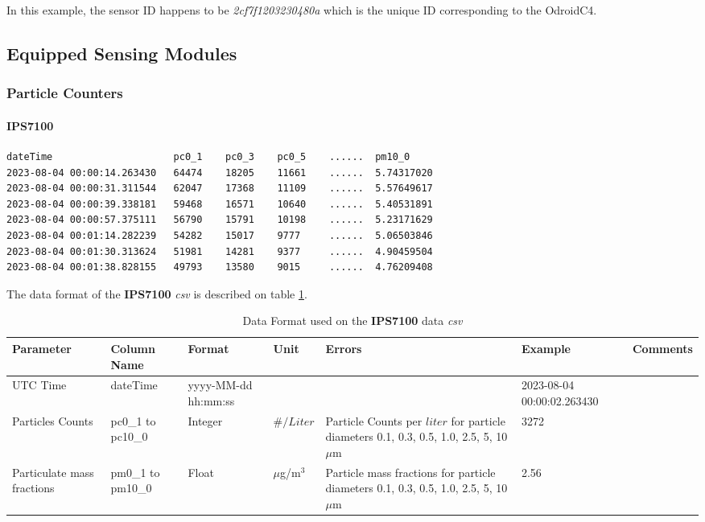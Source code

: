 \documentclass[12pt]{article}
\begin{document}
In this example, the sensor ID happens to be \emph{2cf7f1203230480a} which is the unique ID corresponding to the OdroidC4.
\clearpage

\subsection{Equipped Sensing Modules}
\subsubsection{Particle Counters}
\paragraph{IPS7100}
\label{sec:ips7100DataFormat}
{
\begin{verbatim}
dateTime                     pc0_1    pc0_3    pc0_5    ......  pm10_0
2023-08-04 00:00:14.263430   64474    18205    11661    ......  5.74317020
2023-08-04 00:00:31.311544   62047    17368    11109    ......  5.57649617
2023-08-04 00:00:39.338181   59468    16571    10640    ......  5.40531891
2023-08-04 00:00:57.375111   56790    15791    10198    ......  5.23171629
2023-08-04 00:01:14.282239   54282    15017    9777     ......  5.06503846
2023-08-04 00:01:30.313624   51981    14281    9377     ......  4.90459504
2023-08-04 00:01:38.828155   49793    13580    9015     ......  4.76209408
\end{verbatim} }
The data format of the \textbf{IPS7100} \emph{csv} is described on table \ref{t:dataFormatips7100}.   
    \begin{table}[H]
	\caption{Data Format used on the \textbf{IPS7100} data \emph{csv}}
	 \label{t:dataFormatips7100}
	\small
	\begin{tabular}{||p{2cm}| p{2cm}|p{2cm}|p{1.5cm}|p{1.5cm}|p{2cm}|p{2cm}||}
	
		\hline
		\hline
		Parameter & Column Name & Format & Unit & Errors & Example & Comments \\ \hline
    	\hline
	    UTC Time & dateTime & yyyy-MM-dd hh:mm:ss & & &\tiny{2023-08-04 00:00:02.263430}   &  \\
        \hline
		Particles Counts & pc0\_1 to pc10\_0 & Integer & $\#/Liter$ & Particle Counts per $liter$ for particle diameters 0.1, 0.3, 0.5, 1.0, 2.5, 5, 10 $\mu$m & 3272 &\\
		    \hline
		Particulate mass \hbox{fractions} & pm0\_1 to pm10\_0 & Float & $\mu$g/m$^{3}$ & Particle mass fractions for particle diameters 0.1, 0.3, 0.5, 1.0, 2.5, 5, 10 $\mu$m & 2.56 &\\
	    \hline
		\hline
	\end{tabular}
\end{table}
\clearpage
\end{document}
